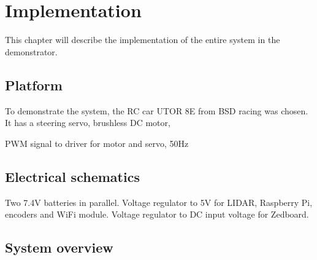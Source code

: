 \chapter{Implementation}
This chapter will describe the implementation of the entire system in the demonstrator.

\section{Platform}
To demonstrate the system, the RC car UTOR 8E from BSD racing was chosen. It has a steering servo, brushless DC motor, 

PWM signal to driver for motor and servo, 50Hz

\section{Electrical schematics}
Two 7.4V batteries in parallel. Voltage regulator to 5V for LIDAR, Raspberry Pi, encoders and WiFi module. Voltage regulator to DC input voltage for Zedboard.

\section{System overview}

